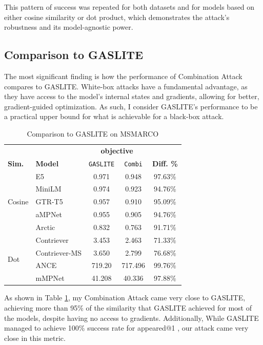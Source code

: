 \documentclass[a4paper, sigconf]{acmart}
\begin{document}
This pattern of success was repeated for both datasets and for models based on either cosine similarity or dot product, which demonstrates the attack's robustness and its model-agnostic power. 


\subsection{Comparison to GASLITE}

The most significant finding is how the performance of Combination Attack compares to GASLITE. White-box attacks have a fundamental advantage, as they have access to the model's internal states and gradients, allowing for better, gradient-guided optimization. As such, I consider GASLITE's performance to be a practical upper bound for what is achievable for a black-box attack. 

\begin{table}[h!]
\caption{Comparison to GASLITE on MSMARCO}
\label{table:gaslite}
  \begin{tabular}{ll|cc|c}
  \hline
  & & \multicolumn{2}{c|}{\textbf{objective}} & \\
  \textbf{Sim.} & \textbf{Model} & \texttt{GASLITE} & \texttt{Combi} & \textbf{Diff. \%} \\
  \hline
  \multirow{5}{*}{Cosine} & E5 & 0.971 & 0.948 & 97.63\% \\
  \hhline{~----}
  & MiniLM & 0.974 & 0.923 & 94.76\% \\
  \hhline{~----}
  & GTR-T5 & 0.957 & 0.910 & 95.09\% \\
  \hhline{~----}
  & aMPNet & 0.955 & 0.905 & 94.76\% \\
  \hhline{~----}
  & Arctic & 0.832 & 0.763 & 91.71\% \\
  \hline
  \multirow{4}{*}{Dot} & Contriever & 3.453 & 2.463 & 71.33\% \\
  \hhline{~----}
  & Contriever-MS & 3.650 & 2.799 & 76.68\% \\
  \hhline{~----}
  & ANCE & 719.20 & 717.496 & 99.76\% \\
  \hhline{~----}
  & mMPNet & 41.208 & 40.336 & 97.88\% \\
  \hline
 \end{tabular}
 \end{table}
 
As shown in Table \ref{table:gaslite}, my Combination Attack came very close to GASLITE, achieving more than 95\% of the similarity that GASLITE achieved for most of the models, despite having no access to gradients. Additionally, While GASLITE managed to achieve 100\% success rate for appeared@1 \cite{bentov2024}, our attack came very close in this metric. 
\end{document}
